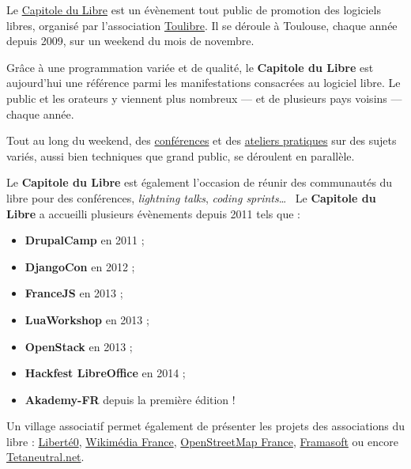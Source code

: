 
Le \href{http://capitoledulibre.org}{Capitole du Libre} est un
 évènement tout public de promotion des logiciels libres,
 organisé par l’association \href{http://toulibre.org/}{Toulibre}.
 Il se déroule à Toulouse, chaque année depuis 2009, sur un 
 weekend du mois de novembre.

Grâce à une programmation variée et de qualité, 
 le \textbf{Capitole du Libre} est aujourd’hui une référence
 parmi les manifestations consacrées au logiciel libre. Le
 public et les orateurs y viennent plus nombreux — et
 de plusieurs pays voisins — chaque année.

Tout au long du weekend, des
 \href{http://2014.capitoledulibre.org/programme/conferences/list/}{conférences}
 et des \href{http://2014.capitoledulibre.org/programme/ateliers/list/}{ateliers pratiques}
 sur des sujets variés, aussi bien techniques que grand public, se déroulent en parallèle.



 
\Separateur

Le \textbf{Capitole du Libre} est également l'occasion de réunir des 
communautés du libre pour des conférences, \textit{lightning talks}, 
\textit{coding sprints}\dots ~ Le \textbf{Capitole du Libre} a 
accueilli plusieurs évènements depuis 2011 tels que :
\begin{itemize}[label=$\bullet$]
\item \textbf{DrupalCamp} en 2011 ;
\item \textbf{DjangoCon} en 2012 ;
\item \textbf{FranceJS} en 2013 ;
\item \textbf{LuaWorkshop} en 2013 ;
\item \textbf{OpenStack} en 2013 ;
\item \textbf{Hackfest LibreOffice}  en 2014 ;
\item \textbf{Akademy-FR} depuis la première édition !
\end{itemize}

\Separateur

Un village associatif permet également de présenter les projets des associations du libre : \href{http://liberte0.org/wiki/index.php?title=Accueil}{Liberté0},
 \href{http://wikimedia.fr/}{Wikimédia France},
 \href{http://openstreetmap.fr/}{OpenStreetMap France},
 \href{http://framasoft.net/}{Framasoft}
 ou encore \href{http://tetaneutral.net/}{Tetaneutral.net}.

